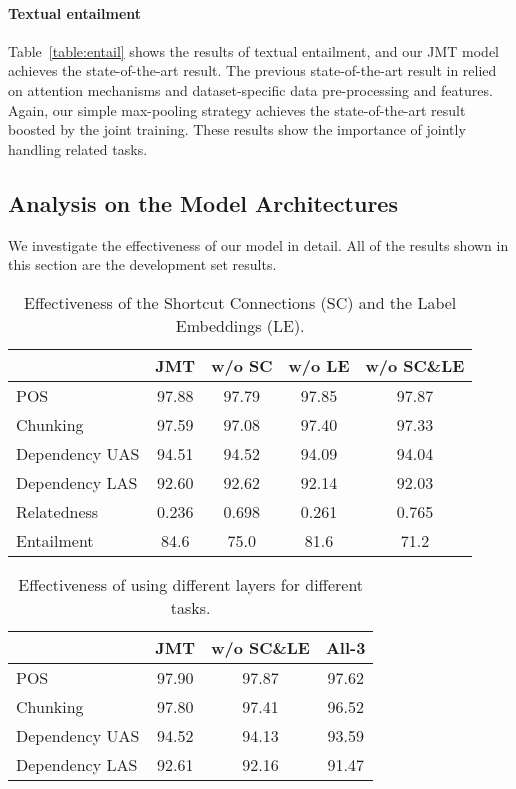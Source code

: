 \documentclass[11pt,a4paper]{article}
\begin{document}
\paragraph{Textual entailment}
Table~\ref{table:entail} shows the results of textual entailment, and our JMT model achieves the state-of-the-art result.
The previous state-of-the-art result in \citet{yin2016abcnn} relied on attention mechanisms and dataset-specific data pre-processing and features.
Again, our simple max-pooling strategy achieves the state-of-the-art result boosted by the joint training.
These results show the importance of jointly handling related tasks.


\subsection{Analysis on the Model Architectures}
We investigate the effectiveness of our model in detail.
All of the results shown in this section are the development set results.

\begin{table}[t]
{\scriptsize
	\begin{center}
	\begin{tabular}{l|c|ccc}
  			   & JMT & w/o SC & w/o LE & w/o SC\&LE \\ \hline
    POS        & 97.88 & 97.79 		& 97.85 & 97.87\\ \hline
    Chunking   & 97.59 & 97.08 		& 97.40 & 97.33 \\ \hline
    Dependency UAS & 94.51 & 94.52 	& 94.09 & 94.04 \\
    Dependency LAS & 92.60 & 92.62 	& 92.14 & 92.03  \\ \hline
    Relatedness    & 0.236 & 0.698 	& 0.261 & 0.765 \\ \hline
    Entailment     & 84.6  & 75.0 	& 81.6  & 71.2  \\ \hline
  \end{tabular}
  \end{center}
}
    \caption{Effectiveness of the Shortcut Connections (SC) and the Label Embeddings (LE).}
    \label{tb:shortcut_comp}
\end{table}

\begin{table}[t]
{\scriptsize
	\begin{center}
  \begin{tabular}{l|c|cc}
  			  		 & JMT  & w/o SC\&LE  & All-3  \\ \hline
    POS        	     & 97.90				 & 97.87       & 97.62 \\ \hline
    Chunking         & 97.80				 & 97.41       & 96.52 \\ \hline
    Dependency UAS   & 94.52				 & 94.13       & 93.59 \\
    Dependency LAS   & 92.61				 & 92.16       & 91.47 \\ \hline
  \end{tabular}
  \end{center}
}
    \caption{Effectiveness of using different layers for different tasks.}
    \label{tb:diff_arch}
\end{table}
\end{document}
